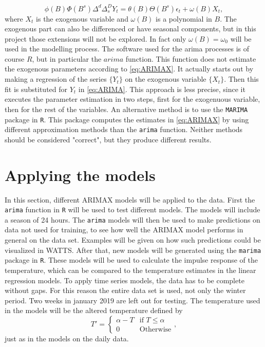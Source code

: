 \begin{equation}
    \phi (B) \Phi (B^s) \Delta^d \Delta_s^D Y_t = \theta (B) \Theta (B^s) \epsilon_t + \omega(B) X_t,
    \label{eq:ARIMAX}
\end{equation}
where $X_t$ is the exogenous variable and $\omega(B)$ is a polynomial in $B$. The exogenous part can also be differenced or have seasonal components, but in this project those extensions will not be explored. In fact only $\omega(B)=\omega_0$ will be used in the modelling process. The software used for the arima processes is of course $R$, but in particular the $arima$ function. This function does not estimate the exogenous parameters according to \cref{eq:ARIMAX}. It actually starts out by making a regression of the series $\{Y_t\}$ on the exogenous variable $\{X_t\}$. Then this fit is substituted for $Y_t$ in \cref{eq:ARIMA}. This approach is less precise, since it executes the parameter estimation in two steps, first for the exogenuous variable, then for the rest of the variables. An alternative method is to use the \texttt{MARIMA} package in \texttt{R}. This package computes the estimates in \cref{eq:ARIMAX} by using different approximation methods than the \texttt{arima} function. Neither methods should be considered "correct", but they produce different results.

\section{Applying the models}
In this section, different ARIMAX models will be applied to the data. First the \texttt{arima} function in \texttt{R} will be used to test different models. The models will include a season of 24 hours. The \texttt{arima} models will then be used to make predictions on data not used for training, to see how well the ARIMAX model performs in general on the data set. Examples will be given on how such predictions could be visualized in WATTS. After that, new models will be generated using the \texttt{marima} package in \texttt{R}. These models will be used to calculate the impulse response of the temperature, which can be compared to the temperature estimates in the linear regression models. To apply time series models, the data has to be complete without gaps. For this reason the entire data set is used, not only the winter period. Two weeks in january 2019 are left out for testing. The temperature used in the models will be the altered temperature defined by
\begin{equation}
    T' = \begin{cases}
        \alpha - T & \text{if } T\leq \alpha\\
        0 & \text{Otherwise}
    \end{cases},
    \label{eq:Ttilde_hour}
\end{equation}
just as in the models on the daily data.

